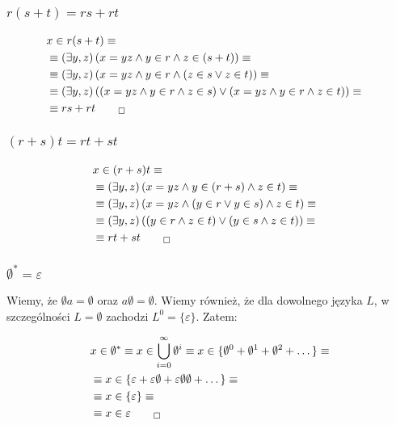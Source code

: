 \documentclass[12pt]{article}
\begin{document}
\subsubsection{$r(s+t)=rs+rt$}

\begin{align}
    &x\in r(s+t) \equiv&\\
    &\equiv \left(\exists y,z \right)\left(x=yz \land y\in r \land z\in (s+t)\right) \equiv\\
    &\equiv \left(\exists y,z \right)\left(x=yz \land y\in r \land \left(z\in s \lor z\in t\right)\right) \equiv\\
    &\equiv \left(\exists y,z \right)\left(\left(x=yz \land y\in r \land z\in s\right) \lor \left(x=yz \land y\in r \land z\in t\right)\right) \equiv\\
    &\equiv rs + rt_{\qed}
\end{align}

\subsubsection{$(r+s)t = rt + st$}

\begin{align}
    &x\in (r+s)t \equiv&\\
    &\equiv \left(\exists y,z \right)\left(x=yz \land y\in (r+s) \land z\in t\right) \equiv\\
    &\equiv \left(\exists y,z \right)\left(x=yz \land \left(y\in r \lor y\in s\right) \land z\in t\right) \equiv\\
    &\equiv \left(\exists y,z \right)\left(\left(y\in r \land z\in t\right) \lor \left(y\in s \land z\in t\right)\right) \equiv\\
    &\equiv rt + st_{\qed}
\end{align}

\subsubsection{$\emptyset^{*} = \varepsilon$}

Wiemy, że $\emptyset a = \emptyset$ oraz $a\emptyset = \emptyset$.
Wiemy również, że dla dowolnego języka $L$, w szczególności $L=\emptyset$ zachodzi $L^{0} = \{\varepsilon\}$. Zatem:

\begin{align}
    &x\in \emptyset^{*} \equiv
    x\in \bigcup_{i=0}^{\infty} \emptyset^{i} \equiv
    x\in \{\emptyset^{0} + \emptyset^{1} + \emptyset^{2} + \dots\} \equiv\\
    &\equiv x \in \{\varepsilon + \varepsilon\emptyset + \varepsilon\emptyset\emptyset + \dots\} \equiv\\
    &\equiv x \in \{\varepsilon\} \equiv\\
    &\equiv x \in \varepsilon_{\qed}
\end{align}
\end{document}
